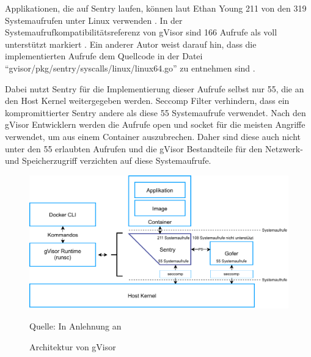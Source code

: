 Applikationen, die auf Sentry laufen, können laut Ethan Young 211 von den 319 Systemaufrufen unter Linux verwenden \cite[vgl.][2]{EthanG.Young.2019}. In der Systemaufrufkompatibilitätsreferenz von gVisor sind 166 Aufrufe als voll unterstützt markiert \cite[vgl.][]{gVisor.20200122}. Ein anderer Autor weist darauf hin, dass die implementierten Aufrufe dem Quellcode in der Datei "`gvisor/pkg/sentry/syscalls/linux/linux64.go"' zu entnehmen sind \cite[vgl.][108]{UdoSeidel.2018}.

Dabei nutzt Sentry für die Implementierung dieser Aufrufe selbst nur 55, die an den Host Kernel weitergegeben werden. Seccomp Filter verhindern, dass ein kompromittierter Sentry andere als diese 55 Systemaufrufe  verwendet.
Nach den gVisor Entwicklern werden die Aufrufe open und socket für die meisten Angriffe verwendet, um aus einem Container auszubrechen. Daher sind diese auch nicht unter den 55 erlaubten Aufrufen und die gVisor Bestandteile für den Netzwerk- und Speicherzugriff verzichten auf diese Systemaufrufe. \cite[vgl.][2]{EthanG.Young.2019}

\begin{figure}[hb]
	\centering
	\includegraphics[width=0.9\linewidth]{gfx/gVisor_arch.pdf}
	\caption{Architektur von gVisor} 
	\footnotesize Quelle: In Anlehnung an \cite[][2]{EthanG.Young.2019}
	\label{fig:gvisor}
\end{figure}

